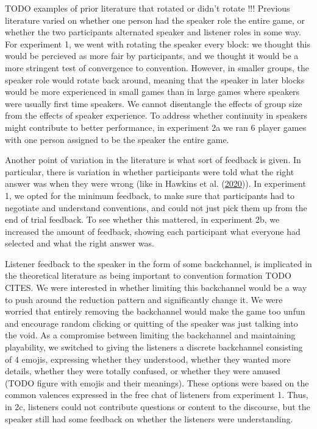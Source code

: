 \documentclass[
  english,
  a4paper,
]{article}
\begin{document}
TODO examples of prior literature that rotated or didn't rotate !!!
Previous literature varied on whether one person had the speaker role the entire game, or whether the two participants alternated speaker and listener roles in some way. For experiment 1, we went with rotating the speaker every block: we thought this would be percieved as more fair by participants, and we thought it would be a more stringent test of convergence to convention. However, in smaller groups, the speaker role would rotate back around, meaning that the speaker in later blocks would be more experienced in small games than in large games where speakers were usually first time speakers. We cannot disentangle the effects of group size from the effects of speaker experience. To address whether continuity in speakers might contribute to better performance, in experiment 2a we ran 6 player games with one person assigned to be the speaker the entire game.

Another point of variation in the literature is what sort of feedback is given. In particular, there is variation in whether participants were told what the right answer was when they were wrong (like in Hawkins et al. (\protect\hyperlink{ref-hawkinsCharacterizingDynamicsLearning2020}{2020})). In experiment 1, we opted for the minimum feedback, to make sure that participants had to negotiate and understand conventions, and could not just pick them up from the end of trial feedback. To see whether this mattered, in experiment 2b, we increased the amount of feedback, showing each participant what everyone had selected and what the right answer was.

Listener feedback to the speaker in the form of some backchannel, is implicated in the theoretical literature as being important to convention formation TODO CITES. We were interested in whether limiting this backchannel would be a way to push around the reduction pattern and significantly change it. We were worried that entirely removing the backchannel would make the game too unfun and encourage random clicking or quitting of the speaker was just talking into the void. As a compromise between limiting the backchannel and maintaining playability, we switched to giving the listeners a discrete backchannel consisting of 4 emojis, expressing whether they understood, whether they wanted more details, whether they were totally confused, or whether they were amused (TODO figure with emojis and their meanings). These options were based on the common valences expressed in the free chat of listeners from experiment 1. Thus, in 2c, listeners could not contribute questions or content to the discourse, but the speaker still had some feedback on whether the listeners were understanding.
\end{document}
